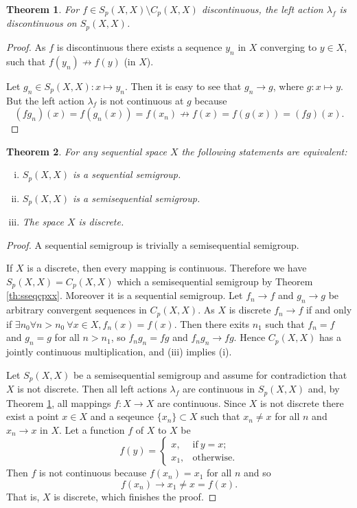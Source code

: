 \documentclass[12pt]{article}
\newtheorem{theorem}{Theorem}
\theoremstyle{definition}
\theoremstyle{remark}
\begin{document}
\begin{theorem}\label{th:dicsontla}
For $f\in S_p(X,X)\setminus C_p(X,X)$ discontinuous, the left action $\lambda_f$ is discontinuous on $S_p(X,X)$.
\end{theorem}
\begin{proof}
As $f$ is discontinuous there exists a sequence $y_n$ in $X$ converging to $y\in X$, such that $f(y_n)\not\to f(y)$ (in $X$).

Let $g_n\in S_p(X,X): x\mapsto y_n$. Then it is easy to see that $g_n\to g$, where $g: x\mapsto y$. But the left action $\lambda_f$ is not continuous at $g$ because
\[
    (fg_n)(x)=f(g_n(x))=f(x_n)\not\to f(x)=f(g(x))=(fg)(x).
\]
\end{proof}

\begin{theorem}\label{th:spdicscr}
For any sequential space $X$ the following statements are equivalent:
\begin{enumerate}[(i)]
	\item $S_p(X,X)$ is a sequential semigroup.
	\item $S_p(X,X)$ is a semisequential semigroup.
	\item The space $X$ is discrete.
\end{enumerate}
\end{theorem}
\begin{proof}
A sequential semigroup is trivially a semisequential semigroup.

If $X$ is a discrete, then every mapping is continuous. Therefore we have $S_p(X,X) = C_p(X,X)$ which a semisequential semigroup by Theorem \ref{th:sseqcpxx}. Moreover it is a sequential semigroup. Let $f_n\to f$ and $g_n\to g$ be arbitrary convergent sequences in $C_p(X,X)$. As $X$ is discrete $f_n\to f$ if and only if $\exists n_0\forall n>n_0\ \forall x\in X, f_n(x) = f(x)$. Then there exits $n_1$ such that $f_n=f$ and $g_n=g$ for all $n>n_1$, so $f_ng_n = fg$ and $f_ng_n \to fg$. Hence $C_p(X,X)$ has a jointly continuous multiplication, and (iii) implies (i).

Let $S_p(X,X)$ be a semisequential semigroup and assume for contradiction that $X$ is not discrete. Then all left actions $\lambda_f$ are continuous in $S_p(X,X)$ and, by Theorem \ref{th:dicsontla}, all mappings $f: X\to X$ are continuous. Since $X$ is not discrete there exist a point $x\in X$ and a seqeunce $\{x_n\}\subset X$ such that $x_n \neq x$ for all $n$ and $x_n\to x$ in $X$. Let a function $f$ of $X$ to $X$ be
\[
    f(y)=\left\{ \begin{array}{ll} x, & \mathrm{if}\ y = x; \\ x_1, & \mathrm{otherwise}. \end{array} \right.
\]
Then $f$ is not continuous because $f(x_n) = x_1$ for all $n$ and so
\[
    f(x_n) \to x_1 \neq x = f(x).
\]
That is, $X$ is discrete, which finishes the proof.
\end{proof}
\end{document}
